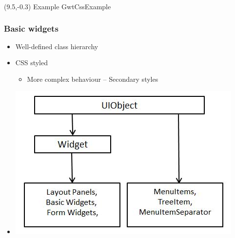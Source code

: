 \documentclass[10pt,table, xcolor=pdflatex]{beamer}
\begin{document}
\begin{frame}[fragile]
\begin{itemize}
\begin{itemize}
\begin{itemize}
              \end{itemize}
          \end{itemize}
	\end{itemize}
\begin{textblock}{15}(9.5,-0.3)
    {\footnotesize Example GwtCssExample}
\end{textblock}
\end{frame}


\begin{frame}\frametitle{Basic widgets}
	\begin{itemize}
		\item Well-defined class hierarchy
		\item CSS styled
        \begin{itemize}
        	\item More complex behaviour -- Secondary styles 
        \end{itemize}
		\item[] \centering\includegraphics[width=0.7\paperwidth]{img/obr2.png}
	\end{itemize}
\end{frame}
\end{document}
